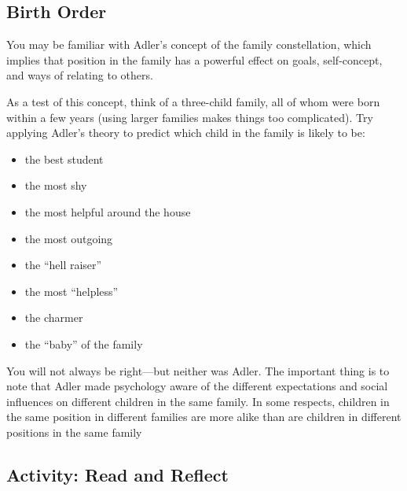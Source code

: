 \documentclass[
]{book}
\providecommand{\tightlist}{%
  \setlength{\itemsep}{0pt}\setlength{\parskip}{0pt}}
\begin{document}
\hypertarget{birth-order}{%
\subsection*{Birth Order}\label{birth-order}}

You may be familiar with Adler's concept of the family constellation, which implies that position in the family has a powerful effect on goals, self-concept, and ways of relating to others.

As a test of this concept, think of a three-child family, all of whom were born within a few years (using larger families makes things too complicated). Try applying Adler's theory to predict which child in the family is likely to be:

\begin{itemize}
\tightlist
\item
  the best student\\
\item
  the most shy\\
\item
  the most helpful around the house\\
\item
  the most outgoing\\
\item
  the ``hell raiser''\\
\item
  the most ``helpless''\\
\item
  the charmer\\
\item
  the ``baby'' of the family
\end{itemize}

You will not always be right---but neither was Adler. The important thing is to note that Adler made psychology aware of the different expectations and social influences on different children in the same family. In some respects, children in the same position in different families are more alike than are children in differ­ent positions in the same family

\hypertarget{activity-read-and-reflect-2}{%
\subsection*{Activity: Read and Reflect}\label{activity-read-and-reflect-2}}
\end{document}
